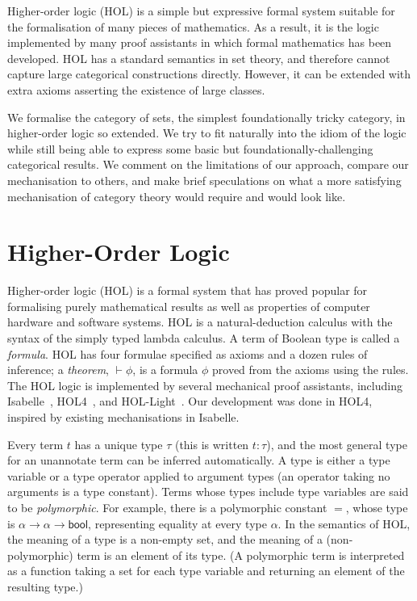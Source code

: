 \documentclass[twoside,titlepage,11pt]{article}
\begin{document}
Higher-order logic (HOL) is a simple but expressive formal system suitable for the formalisation of many pieces of mathematics.
As a result, it is the logic implemented by many proof assistants in which formal mathematics has been developed.
HOL has a standard semantics in set theory, and therefore cannot capture large categorical constructions directly.
However, it can be extended with extra axioms asserting the existence of large classes.

We formalise the category of sets, the simplest foundationally tricky category, in higher-order logic so extended.
We try to fit naturally into the idiom of the logic while still being able to express some basic but foundationally-challenging categorical results.
We comment on the limitations of our approach, compare our mechanisation to others, and make brief speculations on what a more satisfying mechanisation of category theory would require and would look like.
\section{Higher-Order Logic}%
\newcommand{\bool}{\ensuremath{\mathsf{bool}}}
Higher-order logic (HOL) is a formal system that has proved popular for formalising purely mathematical results as well as properties of computer hardware and software systems.
HOL is a natural-deduction calculus with the syntax of the simply typed lambda calculus.
A term of Boolean type is called a \emph{formula}.
HOL has four formulae specified as axioms and a dozen rules of inference; a \emph{theorem}, $\vdash\phi$, is a formula $\phi$ proved from the axioms using the rules.
The HOL logic is implemented by several mechanical proof assistants, including Isabelle~\cite{DBLP:conf/tphol/WenzelPN08}, HOL4~\cite{DBLP:conf/tphol/SlindN08}, and HOL-Light~\cite{DBLP:conf/tphol/Harrison09a}.
Our development was done in HOL4, inspired by existing mechanisations \cite{Katovsky,DBLP:journals/entcs/OKeefe04} in Isabelle.

Every term $t$ has a unique type $\tau$ (this is written $t:\tau$), and the most general type for an unannotate term can be inferred automatically.
A type is either a type variable or a type operator applied to argument types (an operator taking no arguments is a type constant).
Terms whose types include type variables are said to be \emph{polymorphic}.
For example, there is a polymorphic constant $=$, whose type is $\alpha\to\alpha\to\bool$, representing equality at every type $\alpha$.
In the semantics of HOL, the meaning of a type is a non-empty set, and the meaning of a (non-polymorphic) term is an element of its type.
(A polymorphic term is interpreted as a function taking a set for each type variable and returning an element of the resulting type.)
\end{document}
